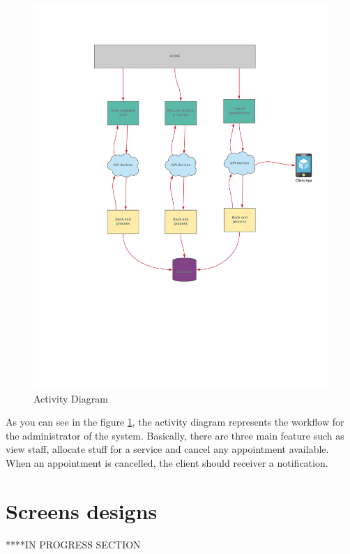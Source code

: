 \begin{figure}[h]
    \centering
    \includegraphics[width=\textwidth]{admin_activity_diagram.png}
    \caption{Activity Diagram}
    \label{fig:mesh1}
\end{figure}

As you can see in the figure \ref{fig:mesh1}, the activity diagram represents the workflow for the administrator of the system. Basically, there are three main feature such as  view staff, allocate stuff for a service and cancel any appointment available. When an appointment is cancelled, the client should receiver a notification.

\section{Screens designs}

****IN PROGRESS SECTION

